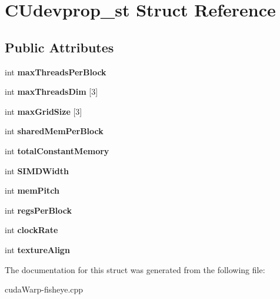 \hypertarget{structCUdevprop__st}{}\section{C\+Udevprop\+\_\+st Struct Reference}
\label{structCUdevprop__st}
\subsection*{Public Attributes}
\begin{DoxyCompactItemize}
\item 
int {\bfseries max\+Threads\+Per\+Block}\hypertarget{structCUdevprop__st_acfadd84244296afa9faa8b719ec21d60}{}\label{structCUdevprop__st_acfadd84244296afa9faa8b719ec21d60}

\item 
int {\bfseries max\+Threads\+Dim} \mbox{[}3\mbox{]}\hypertarget{structCUdevprop__st_a4a3092523828f02d6da2d781c7d84566}{}\label{structCUdevprop__st_a4a3092523828f02d6da2d781c7d84566}

\item 
int {\bfseries max\+Grid\+Size} \mbox{[}3\mbox{]}\hypertarget{structCUdevprop__st_a5ebd895c078faef66af9161e15b72bc9}{}\label{structCUdevprop__st_a5ebd895c078faef66af9161e15b72bc9}

\item 
int {\bfseries shared\+Mem\+Per\+Block}\hypertarget{structCUdevprop__st_aacf65a7a9ed605729672ba5f4e5555b2}{}\label{structCUdevprop__st_aacf65a7a9ed605729672ba5f4e5555b2}

\item 
int {\bfseries total\+Constant\+Memory}\hypertarget{structCUdevprop__st_a62815f20f7148e28f9931f6716c22b6a}{}\label{structCUdevprop__st_a62815f20f7148e28f9931f6716c22b6a}

\item 
int {\bfseries S\+I\+M\+D\+Width}\hypertarget{structCUdevprop__st_a7fd2598da1e06b93558b55148b81e9d4}{}\label{structCUdevprop__st_a7fd2598da1e06b93558b55148b81e9d4}

\item 
int {\bfseries mem\+Pitch}\hypertarget{structCUdevprop__st_a155c47c12185bec4eb0c4fed6deb1843}{}\label{structCUdevprop__st_a155c47c12185bec4eb0c4fed6deb1843}

\item 
int {\bfseries regs\+Per\+Block}\hypertarget{structCUdevprop__st_ac14a1b621219af7bfb7fc12ab42e8864}{}\label{structCUdevprop__st_ac14a1b621219af7bfb7fc12ab42e8864}

\item 
int {\bfseries clock\+Rate}\hypertarget{structCUdevprop__st_a753144656483408f719b2e66e92508c3}{}\label{structCUdevprop__st_a753144656483408f719b2e66e92508c3}

\item 
int {\bfseries texture\+Align}\hypertarget{structCUdevprop__st_ae60df0edd93b7591d433df4011a9f2a3}{}\label{structCUdevprop__st_ae60df0edd93b7591d433df4011a9f2a3}

\end{DoxyCompactItemize}


The documentation for this struct was generated from the following file\+:\begin{DoxyCompactItemize}
\item 
cuda\+Warp-\/fisheye.\+cpp\end{DoxyCompactItemize}
